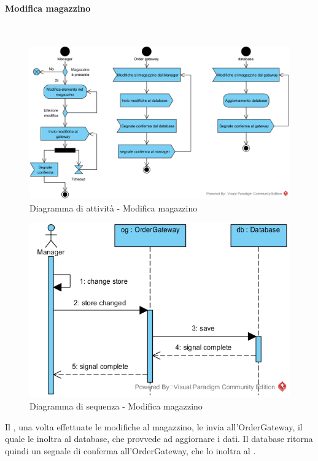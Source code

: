 \paragraph{Modifica magazzino}\mbox{}\\
\nopagebreak
\begin{figure}[H]
	\centering
	\includegraphics[width=14cm]{diagrammi_img/attivita/manager_mag_modifiche.png}
	\caption{Diagramma di attività - Modifica magazzino}
\end{figure}

\begin{figure}[H]
	\centering
	\includegraphics[width=14cm]{../../documenti/SpecificaTecnica/diagrammi_img/sequenza/direttore_modifica_magazzino.png}
	\caption{Diagramma di sequenza - Modifica magazzino}
\end{figure}
Il \Manager{}, una volta effettuate le modifiche al magazzino, le invia all'Order\-Gateway, il quale le inoltra al database, che provvede ad aggiornare i dati. Il database ritorna quindi un segnale di conferma all'Order\-Gateway, che lo inoltra al \Manager{}.


